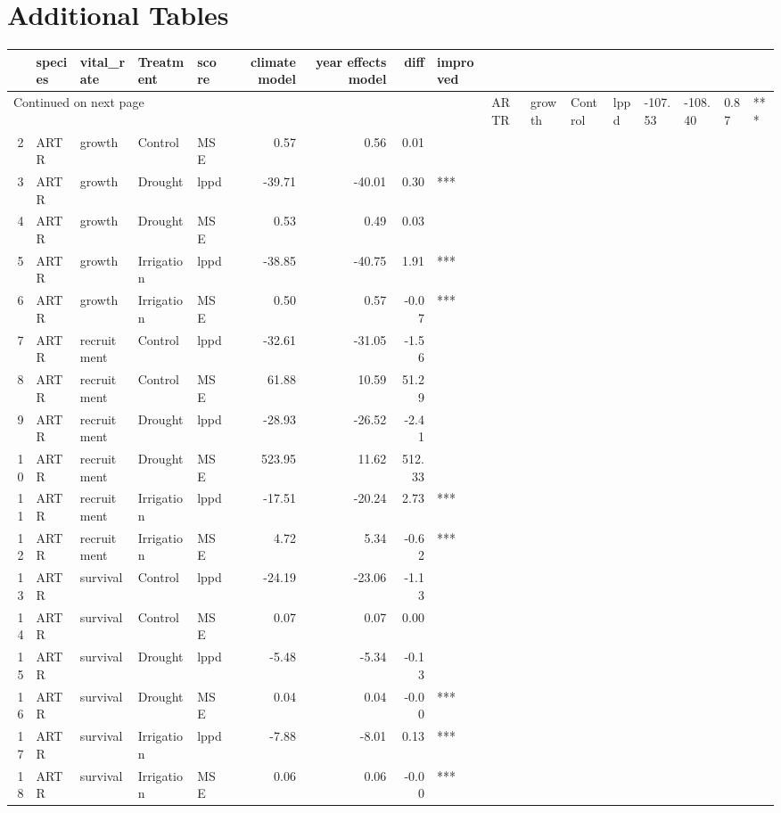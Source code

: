 \documentclass[11pt]{article}
\begin{document}
\section{Additional Tables} 
\begin{longtable}{rllllrrrl}
	\hline
	& species & vital\_rate & Treatment & score & climate model & year effects model & diff & improved \\ 
	\hline
	\endhead
	\hline
	\multicolumn{9}{l}{\footnotesize Continued on next page}
	\endfoot
	\endlastfoot
	1 & ARTR & growth & Control & lppd & -107.53 & -108.40 & 0.87 & *** \\ 
	2 & ARTR & growth & Control & MSE & 0.57 & 0.56 & 0.01 &  \\ 
	3 & ARTR & growth & Drought & lppd & -39.71 & -40.01 & 0.30 & *** \\ 
	4 & ARTR & growth & Drought & MSE & 0.53 & 0.49 & 0.03 &  \\ 
	5 & ARTR & growth & Irrigation & lppd & -38.85 & -40.75 & 1.91 & *** \\ 
	6 & ARTR & growth & Irrigation & MSE & 0.50 & 0.57 & -0.07 & *** \\ 
	7 & ARTR & recruitment & Control & lppd & -32.61 & -31.05 & -1.56 &  \\ 
	8 & ARTR & recruitment & Control & MSE & 61.88 & 10.59 & 51.29 &  \\ 
	9 & ARTR & recruitment & Drought & lppd & -28.93 & -26.52 & -2.41 &  \\ 
	10 & ARTR & recruitment & Drought & MSE & 523.95 & 11.62 & 512.33 &  \\ 
	11 & ARTR & recruitment & Irrigation & lppd & -17.51 & -20.24 & 2.73 & *** \\ 
	12 & ARTR & recruitment & Irrigation & MSE & 4.72 & 5.34 & -0.62 & *** \\ 
	13 & ARTR & survival & Control & lppd & -24.19 & -23.06 & -1.13 &  \\ 
	14 & ARTR & survival & Control & MSE & 0.07 & 0.07 & 0.00 &  \\ 
	15 & ARTR & survival & Drought & lppd & -5.48 & -5.34 & -0.13 &  \\ 
	16 & ARTR & survival & Drought & MSE & 0.04 & 0.04 & -0.00 & *** \\ 
	17 & ARTR & survival & Irrigation & lppd & -7.88 & -8.01 & 0.13 & *** \\ 
	18 & ARTR & survival & Irrigation & MSE & 0.06 & 0.06 & -0.00 & *** \\ 

\end{longtable}
\end{document}
